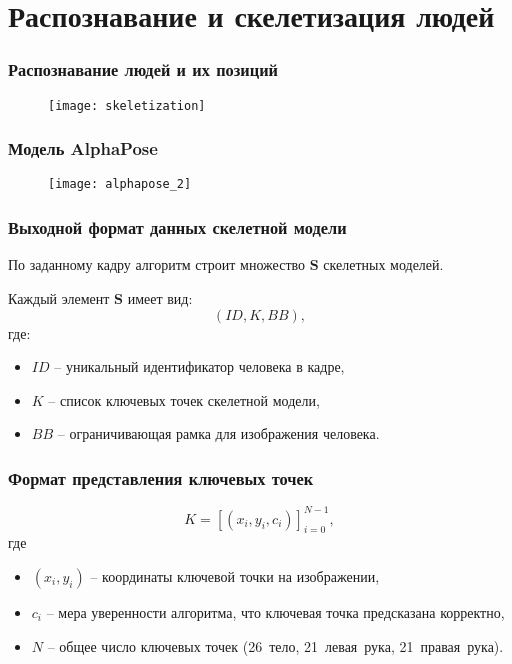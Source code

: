 \section{Распознавание и скелетизация людей}
\begin{frame}
    \frametitle{Распознавание людей и их позиций}
    \begin{figure}
        \centering
        \texttt{[image: skeletization]}
    \end{figure}
\end{frame}


\begin{frame}
    \frametitle{Модель AlphaPose}
    \begin{figure}
        \centering
        \texttt{[image: alphapose\_2]}
    \end{figure}
\end{frame}

\begin{frame}
    \frametitle{Выходной формат данных скелетной модели}
    По заданному кадру алгоритм строит множество $\mathbf{S}$ скелетных моделей.

    Каждый элемент $\mathbf{S}$ имеет вид:
    $$ \left(ID, K, BB\right), $$
    где:
    \begin{itemize}
        \item $ID$ -- уникальный идентификатор человека в кадре,
        \item $K$ -- список ключевых точек скелетной модели,
        \item $BB$ -- ограничивающая рамка для изображения человека.
    \end{itemize}
\end{frame}

\begin{frame}
    \frametitle{Формат представления ключевых точек}
    $$ K = [(x_i, y_i, c_i)]_{i=0}^{N-1}, $$
    где
    \begin{itemize}
        \item $(x_i, y_i)$ -- координаты ключевой точки на изображении,
        \item $c_i$ -- мера уверенности алгоритма, что ключевая точка предсказана корректно,
        \item $N$ -- общее число ключевых точек (26~тело, 21~левая~рука, 21~правая~рука).
    \end{itemize}
\end{frame}

